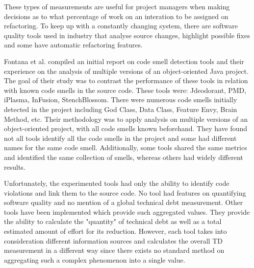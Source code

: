 \documentclass{mprop}
\begin{document}

These types of measurements are useful for project managers when making
decisions as to what percentage of work on an interation to be assigned on
refactoring. To keep up with a constantly changing system, there are software
quality tools used in industry that analyse source changes, highlight possible
fixes and some have automatic refactoring features.

Fontana et al. \cite{Fontana2011} compiled an initial report on code smell
detection tools and their experience on the analysis of multiple versions of an
object-oriented Java project. The goal of their study was to contrast the
performance of these tools in relation with known code smells in the source
code. These tools were: Jdeodorant, PMD, iPlasma, InFusion, StenchBlossom. There
were numerous code smells initially detected in the project including God Class,
Data Class, Feature Envy, Brain Method, etc. Their methodology was to apply
analysis on multiple versions of an object-oriented project, with all code
smells known beforehand. They have found not all tools identify all the code
smells in the project and some had different names for the same code smell.
Additionally, some tools shared the same metrics and identified the same
collection of smells, whereas others had widely different results.

Unfortunately, the experimented tools had only the ability to identify code
violations and link them to the source code. No tool had features on quantifying
software quality and no mention of a global technical debt measurement. Other
tools have been implemented which provide such aggregated values. They provide
the ability to calculate the "quantity" of technical debt as well as a total
estimated amount of effort for its reduction. However, each tool takes into
consideration different information sources and calculates the overall TD
measurement in a different way since there exists no standard method on
aggregating such a complex phenomenon into a single value.
\end{document}
